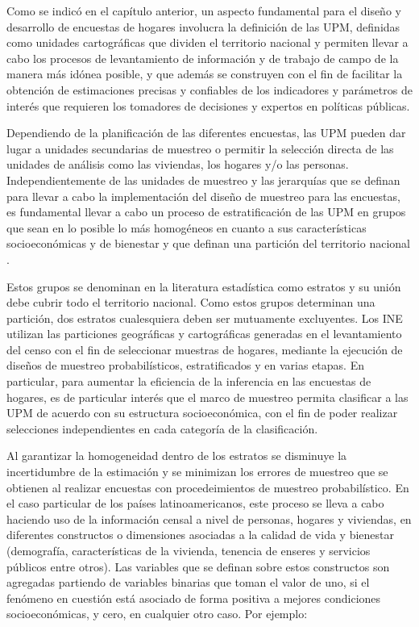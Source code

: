 \documentclass[
  12pt,
]{book}
\begin{document}
Como se indicó en el capítulo anterior, un aspecto fundamental para el diseño y desarrollo de encuestas de hogares involucra la definición de las UPM, definidas como unidades cartográficas que dividen el territorio nacional y permiten llevar a cabo los procesos de levantamiento de información y de trabajo de campo de la manera más idónea posible, y que además se construyen con el fin de facilitar la obtención de estimaciones precisas y confiables de los indicadores y parámetros de interés que requieren los tomadores de decisiones y expertos en políticas públicas.

Dependiendo de la planificación de las diferentes encuestas, las UPM pueden dar lugar a unidades secundarias de muestreo o permitir la selección directa de las unidades de análisis como las viviendas, los hogares y/o las personas. Independientemente de las unidades de muestreo y las jerarquías que se definan para llevar a cabo la implementación del diseño de muestreo para las encuestas, es fundamental llevar a cabo un proceso de estratificación de las UPM en grupos que sean en lo posible lo más homogéneos en cuanto a sus características socioeconómicas y de bienestar y que definan una partición del territorio nacional \citep{Gutierrez_2016}.

Estos grupos se denominan en la literatura estadística como estratos y su unión debe cubrir todo el territorio nacional. Como estos grupos determinan una partición, dos estratos cualesquiera deben ser mutuamente excluyentes. Los INE utilizan las particiones geográficas y cartográficas generadas en el levantamiento del censo con el fin de seleccionar muestras de hogares, mediante la ejecución de diseños de muestreo probabilísticos, estratificados y en varias etapas. En particular, para aumentar la eficiencia de la inferencia en las encuestas de hogares, es de particular interés que el marco de muestreo permita clasificar a las UPM de acuerdo con su estructura socioeconómica, con el fin de poder realizar selecciones independientes en cada categoría de la clasificación.

Al garantizar la homogeneidad dentro de los estratos se disminuye la incertidumbre de la estimación y se minimizan los errores de muestreo que se obtienen al realizar encuestas con procedeimientos de muestreo probabilístico. En el caso particular de los países latinoamericanos, este proceso se lleva a cabo haciendo uso de la información censal a nivel de personas, hogares y viviendas, en diferentes constructos o dimensiones asociadas a la calidad de vida y bienestar (demografía, características de la vivienda, tenencia de enseres y servicios públicos entre otros). Las variables que se definan sobre estos constructos son agregadas partiendo de variables binarias que toman el valor de uno, si el fenómeno en cuestión está asociado de forma positiva a mejores condiciones socioeconómicas, y cero, en cualquier otro caso. Por ejemplo:
\end{document}

